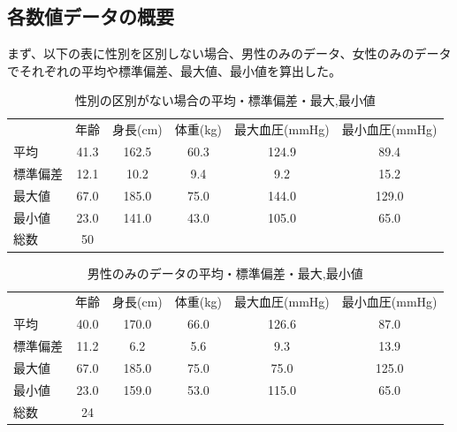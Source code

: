 \documentclass[dvipdfmx]{jsarticle}
\begin{document}
    \subsection{各数値データの概要}
    まず、以下の表に性別を区別しない場合、男性のみのデータ、女性のみのデータでそれぞれの平均や標準偏差、最大値、最小値を算出した。
    \begin{table}[H]
        \caption{性別の区別がない場合の平均・標準偏差・最大,最小値}
        \centering
        \begin{tabular}{lccccc}
            & \multicolumn{1}{r}{年齢} & \multicolumn{1}{r}{身長(cm)} & \multicolumn{1}{r}{体重(kg)} & \multicolumn{1}{r}{最大血圧(mmHg)} & \multicolumn{1}{r}{最小血圧(mmHg)} \\
        平均   & 41.3                   & 162.5                  & 60.3                   & 124.9                    & 89.4                     \\
        標準偏差 & 12.1                   & 10.2                   & 9.4                    & 9.2                      & 15.2                     \\
        最大値  & 67.0                   & 185.0                  & 75.0                   & 144.0                    & 129.0                    \\
        最小値  & 23.0                   & 141.0                  & 43.0                   & 105.0                    & 65.0                     \\
        \hline
        総数 & 50 &  &  &  &  

    \end{tabular}
    \end{table}
    \begin{table}[H]
        \caption{男性のみのデータの平均・標準偏差・最大,最小値}
        \centering
        \begin{tabular}{lccccc}

            & \multicolumn{1}{r}{年齢} & \multicolumn{1}{r}{身長(cm)} & \multicolumn{1}{r}{体重(kg)} & \multicolumn{1}{r}{最大血圧(mmHg)} & \multicolumn{1}{r}{最小血圧(mmHg)} \\
        平均   & 40.0                   & 170.0                  & 66.0                   & 126.6                    & 87.0                     \\
        標準偏差 & 11.2                   & 6.2                    & 5.6                    & 9.3                      & 13.9                     \\
        最大値  & 67.0                   & 185.0                  & 75.0                   & 75.0                     & 125.0                    \\
        最小値  & 23.0                   & 159.0                  & 53.0                   & 115.0                    & 65.0                     \\
        \hline
        総数 & 24 &  &  &  & 
    \end{tabular}
    \end{table}
\end{document}
